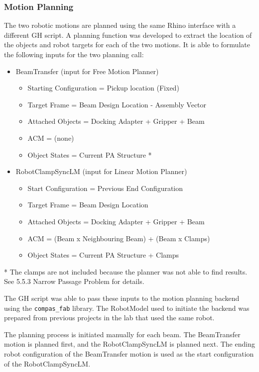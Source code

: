 \subsubsection{Motion Planning}
The two robotic motions are planned using the same Rhino interface with a different GH script. A planning function was developed to extract the location of the objects and robot targets for each of the two motions. It is able to formulate the following inputs for the two planning call:
\begin{itemize}
    \item BeamTransfer (input for Free Motion Planner)
    \begin{itemize}
        \item Starting Configuration = Pickup location (Fixed)
        \item Target Frame = Beam Design Location - Assembly Vector
        \item Attached Objects = Docking Adapter + Gripper + Beam
        \item ACM = (none)
        \item Object States = Current PA Structure *
    \end{itemize}
    \item RobotClampSyncLM (input for Linear Motion Planner)
    \begin{itemize}
        \item Start Configuration = Previous End Configuration
        \item Target Frame = Beam Design Location
        \item Attached Objects = Docking Adapter + Gripper + Beam
        \item ACM = (Beam x Neighbouring Beam) + (Beam x Clamps)
        \item Object States = Current PA Structure + Clamps
    \end{itemize}
\end{itemize}
* The clamps are not included because the planner was not able to find results. See 5.5.3 Narrow Passage Problem for details.

The GH script was able to pass these inputs to the motion planning backend using the \verb|compas_fab| library. The RobotModel used to initiate the backend was prepared from previous projects in the lab that used the same robot. 

The planning process is initiated manually for each beam. The BeamTransfer motion is planned first, and the RobotClampSyncLM is planned next. The ending robot configuration of the BeamTransfer motion is used as the start configuration of the RobotClampSyncLM.

